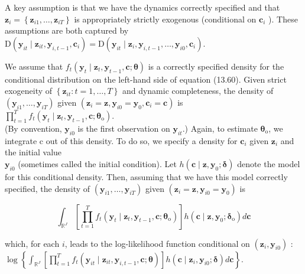 \documentclass[10pt]{article}
\begin{document}
A key assumption is that we have the dynamics correctly specified and that $\mathbf{z}_{i}= \left\{\mathbf{z}_{i 1}, \ldots, \mathbf{z}_{i T}\right\}$ is appropriately strictly exogenous (conditional on $\mathbf{c}_{i}$ ). These assumptions are both captured by\\
$\mathrm{D}\left(\mathbf{y}_{i t} \mid \mathbf{z}_{i t}, \mathbf{y}_{i, t-1}, \mathbf{c}_{i}\right)=\mathrm{D}\left(\mathbf{y}_{i t} \mid \mathbf{z}_{i}, \mathbf{y}_{i, t-1}, \ldots, \mathbf{y}_{i 0}, \mathbf{c}_{i}\right)$.

We assume that $f_{t}\left(\mathbf{y}_{t} \mid \mathbf{z}_{t}, \mathbf{y}_{t-1}, \mathbf{c} ; \boldsymbol{\theta}\right)$ is a correctly specified density for the conditional distribution on the left-hand side of equation (13.60). Given strict exogeneity of $\left\{\mathbf{z}_{i t}: t=1, \ldots, T\right\}$ and dynamic completeness, the density of $\left(\mathbf{y}_{i 1}, \ldots, \mathbf{y}_{i T}\right)$ given $\left(\mathbf{z}_{i}=\mathbf{z}, \mathbf{y}_{i 0}=\mathbf{y}_{0}, \mathbf{c}_{i}=\mathbf{c}\right)$ is\\
$\prod_{t=1}^{T} f_{t}\left(\mathbf{y}_{t} \mid \mathbf{z}_{t}, \mathbf{y}_{t-1}, \mathbf{c} ; \boldsymbol{\theta}_{\mathrm{o}}\right)$.\\
(By convention, $\mathbf{y}_{i 0}$ is the first observation on $\mathbf{y}_{i t}$.) Again, to estimate $\boldsymbol{\theta}_{\mathrm{o}}$, we integrate c out of this density. To do so, we specify a density for $\mathbf{c}_{i}$ given $\mathbf{z}_{i}$ and the initial value\\
$\mathbf{y}_{i 0}$ (sometimes called the initial condition). Let $h\left(\mathbf{c} \mid \mathbf{z}, \mathbf{y}_{0} ; \boldsymbol{\delta}\right)$ denote the model for this conditional density. Then, assuming that we have this model correctly specified, the density of $\left(\mathbf{y}_{i 1}, \ldots, \mathbf{y}_{i T}\right)$ given $\left(\mathbf{z}_{i}=\mathbf{z}, \mathbf{y}_{i 0}=\mathbf{y}_{0}\right)$ is


\begin{equation*}
\int_{\mathbb{R}^{J}}\left[\prod_{t=1}^{T} f_{t}\left(\mathbf{y}_{t} \mid \mathbf{z}_{t}, \mathbf{y}_{t-1}, \mathbf{c} ; \boldsymbol{\theta}_{\mathrm{o}}\right)\right] h\left(\mathbf{c} \mid \mathbf{z}, \mathbf{y}_{0} ; \boldsymbol{\delta}_{\mathrm{o}}\right) d \mathbf{c} \tag{13.62}
\end{equation*}


which, for each $i$, leads to the log-likelihood function conditional on $\left(\mathbf{z}_{i}, \mathbf{y}_{i 0}\right)$ :\\
$\log \left\{\int_{\mathbb{R}^{J}}\left[\prod_{t=1}^{T} f_{t}\left(\mathbf{y}_{i t} \mid \mathbf{z}_{i t}, \mathbf{y}_{i, t-1}, \mathbf{c} ; \boldsymbol{\theta}\right)\right] h\left(\mathbf{c} \mid \mathbf{z}_{i}, \mathbf{y}_{i 0} ; \boldsymbol{\delta}\right) d \mathbf{c}\right\}$.
\end{document}
